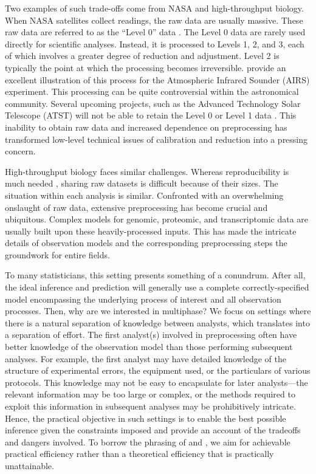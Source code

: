Two examples of such trade-offs come from NASA and high-throughput biology.
When NASA satellites collect readings, the raw data are usually massive.
These raw data are referred to as the ``Level 0'' data \citep{ChandraSDP}.
The Level 0 data are rarely used directly for scientific analyses.
Instead, it is processed to Levels 1, 2, and 3, each of which involves a greater degree of reduction and adjustment.
Level 2 is typically the point at which the processing becomes irreversible.
\cite{Braverman2012} provide an excellent illustration of this process for the Atmospheric Infrared Sounder (AIRS) experiment.
This processing can be quite controversial within the astronomical community.
Several upcoming projects, such as the Advanced Technology Solar Telescope (ATST) will not be able to retain the Level 0 or Level 1 data \citep{Davey2012}.
This inability to obtain raw data and increased dependence on preprocessing has transformed low-level technical issues of calibration and reduction into a pressing concern.

High-throughput biology faces similar challenges.
Whereas reproducibility is much needed \citep[e.g. ][]{Ioannidis2011}, sharing raw datasets is difficult because of their sizes.
The situation within each analysis is similar.
Confronted with an overwhelming onslaught of raw data, extensive preprocessing has become crucial and ubiquitous.
Complex models for genomic, proteomic, and transcriptomic data are usually built upon these heavily-processed inputs.
This has made the intricate details of observation models and the corresponding preprocessing steps the groundwork for entire fields.

To many statisticians, this setting presents something of a conundrum.
After all, the ideal inference and prediction will generally use a complete correctly-specified model encompassing the underlying process of interest and all observation processes.
Then, why are we interested in multiphase?
We focus on settings where there is a natural separation of knowledge between analysts, which translates into a separation of effort.
The first analyst(s) involved in preprocessing often have better knowledge of the observation model than those performing subsequent analyses.
For example, the first analyst may have detailed knowledge of the structure of experimental errors, the equipment used, or the particulars of various protocols.
This knowledge may not be easy to encapsulate for later analysts---the relevant information may be too large or complex, or the methods required to exploit this information in subsequent analyses may be prohibitively intricate.
%
%
Hence, the practical objective in such settings is to enable the best possible inference given the constraints imposed and provide an account of the tradeoffs and dangers involved.
To borrow the phrasing of \citet{Meng2003} and \citet{Rubin1996}, we aim for achievable practical efficiency rather than a theoretical efficiency that is practically unattainable.


